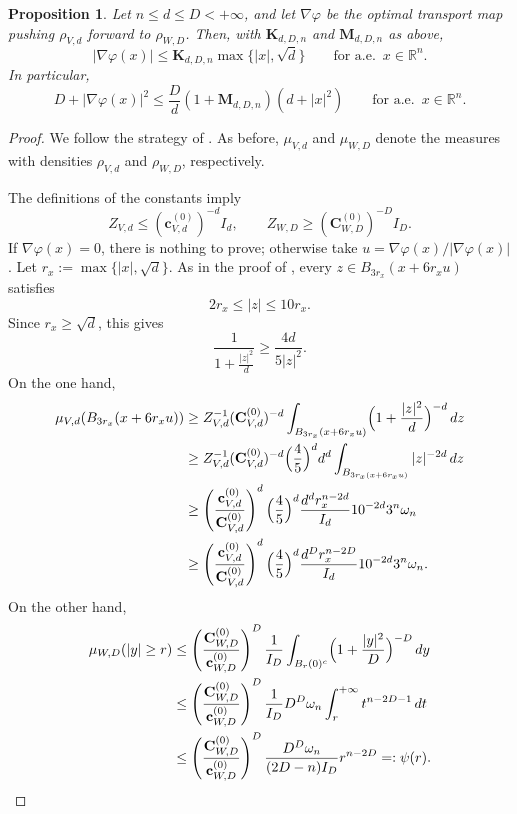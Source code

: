 \documentclass[11pt,a4paper,reqno]{amsart}
\numberwithin{equation}{section}
\newtheorem{proposition}[theorem]{Proposition}
\theoremstyle{definition}
\newcommand{\<}{\ensuremath \leq}
\renewcommand{\>}{\ensuremath \geq}
\newcommand{\Znorm}[2]{Z_{#1,#2}}
\newcommand{\CVp}[1]{\mathbf{C}_{V,#1}}
\newcommand{\CWp}[1]{\mathbf{C}_{W,#1}}
\newcommand{\cVp}[1]{\mathbf{c}_{V,#1}}
\newcommand{\cWp}[1]{\mathbf{c}_{W,#1}}
\begin{document}
\begin{proposition}\label{Finite_D_growth}
Let $n\le d\le D<+\infty$, and let $\nabla\varphi$ be the optimal transport map pushing $\rho_{V,d}$ forward to $\rho_{W,D}$. Then, with $\mathbf{K}_{d,D,n}$ and $\mathbf{M}_{d,D,n}$ as above,
\[
    |\nabla\varphi(x)|
    \le
    \mathbf{K}_{d,D,n}\max\{|x|,\sqrt d\}
    \qquad \text{for a.e. }\, x\in\mathbb{R}^n.
\]
In particular,
\[
    D+|\nabla\varphi(x)|^2
    \le
    \frac{D}{d}\left(1+\mathbf{M}_{d,D,n}\right)(d+|x|^2)
    \qquad \text{for a.e. }\, x\in\mathbb{R}^n.
\]
\end{proposition}

\begin{proof}
We follow the strategy of \cite[Lemma 3.6 (i)]{Fathi}. As before, $\mu_{V,d}$ and $\mu_{W,D}$ denote the measures with densities $\rho_{V,d}$ and $\rho_{W,D}$, respectively.

The definitions of the constants imply
\[
    \Znorm{V}{d}\le (\cVp{d}^{(0)})^{-d}I_d,
    \qquad
    \Znorm{W}{D}\ge (\CWp{D}^{(0)})^{-D}I_D.
\]
If $\nabla\varphi(x)=0$, there is nothing to prove; otherwise take $u=\nabla\varphi(x)/|\nabla\varphi(x)|$. Let $r_x:=\max\{|x|,\sqrt d\}$. As in the proof of \cite[Theorem 4.4]{Fathi}, every $z\in B_{3r_x}(x+6r_xu)$ satisfies
\[
    2r_x\le |z|\le 10r_x.
\]
Since $r_x\ge\sqrt d$, this gives
\[
    \frac{1}{1+\frac{|z|^2}{d}}\ge \frac{4d}{5|z|^2}.
\]
On the one hand, 
\[
\begin{aligned}
\mu_{V,d}(B_{3r_x}(x+6r_xu)) &\ge Z_{V,d}^{-1}(\CVp{d}^{(0)})^{-d} \int_{B_{3r_x}(x+6r_xu)}\Bigl(1+\frac {|z|^2}d\Bigl)^{-d}\, dz
\\
&\ge Z_{V,d}^{-1}(\mathbf{C}_{V,d}^{(0)})^{-d} \Bigl(\frac 45\Bigl)^dd^d \int_{B_{3r_x(x+6r_xu)}}|z|^{-2d}\, dz \\
&\ge
\left(\frac{\cVp{d}^{(0)}}{\CVp{d}^{(0)}}\right)^d
\Bigl(\frac{4}{5}\Bigr)^d
\frac{d^d r_x^{n-2d}}{I_d}
10^{-2d}3^n\omega_n\\
&\ge
\left(\frac{\cVp{d}^{(0)}}{\CVp{d}^{(0)}}\right)^d
\Bigl(\frac{4}{5}\Bigr)^d
\frac{d^D r_x^{n-2D}}{I_d}
10^{-2d}3^n\omega_n.
\end{aligned}
\]
On the other hand, 
\[
\begin{aligned}
\mu_{W,D}(|y|\ge r)
&\le
\left(\frac{\CWp{D}^{(0)}}{\cWp{D}^{(0)}}\right)^D
\frac{1}{I_D}
\int_{B_r(0)^c}\Bigl(1+\frac{|y|^2}{D}\Bigr)^{-D}\,dy \\
&\le \left(\frac{\CWp{D}^{(0)}}{\cWp{D}^{(0)}}\right)^D
\frac{1}{I_D} D^D \omega_n \int_{r}^{+\infty} t^{n-2D-1}\, dt \\
&\le
\left(\frac{\CWp{D}^{(0)}}{\cWp{D}^{(0)}}\right)^D
\frac{D^{D}\omega_n}{(2D-n)I_D}r^{n-2D}
=:\psi(r).
\end{aligned}
\]




\end{proof}
\end{document}
